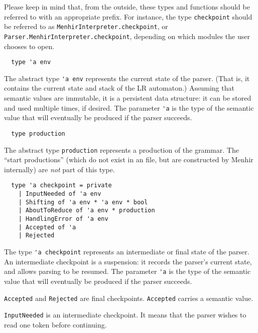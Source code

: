 \documentclass[onecolumn,11pt,nocopyrightspace,preprint]{sigplanconf}
\begin{document}
Please keep in mind that, from the outside, these types and functions should be referred
to with an appropriate prefix. For instance, the type \verb+checkpoint+ should be referred
to as \verb+MenhirInterpreter.checkpoint+, or
\verb+Parser.MenhirInterpreter.checkpoint+, depending on which modules the user
chooses to open.




\begin{verbatim}
  type 'a env
\end{verbatim}

The abstract type \verb+'a env+ represents the current state of the
parser. (That is, it contains the current state and stack of the LR
automaton.) Assuming that semantic values are immutable, it is a persistent
data structure: it can be stored and used multiple times, if desired.
The parameter \verb+'a+ is the type of the semantic value that will
eventually be produced if the parser succeeds.


\begin{verbatim}
  type production
\end{verbatim}

The abstract type \verb+production+ represents a production of the grammar.
%
The ``start productions'' (which do not exist in an \mly file, but are
constructed by Menhir internally) are \emph{not} part of this type.


\begin{verbatim}
  type 'a checkpoint = private
    | InputNeeded of 'a env
    | Shifting of 'a env * 'a env * bool
    | AboutToReduce of 'a env * production
    | HandlingError of 'a env
    | Accepted of 'a
    | Rejected
\end{verbatim}

The type \verb+'a checkpoint+ represents an intermediate or
final state of the parser. An intermediate checkpoint is a suspension: it records
the parser's current state, and allows parsing to be resumed. The parameter
\verb+'a+ is the type of the semantic value that will eventually be produced
if the parser succeeds.

\verb+Accepted+ and \verb+Rejected+ are final checkpoints. \verb+Accepted+ carries
a semantic value.

\verb+InputNeeded+ is an intermediate checkpoint. It means that the parser wishes
to read one token before continuing.
\end{document}

